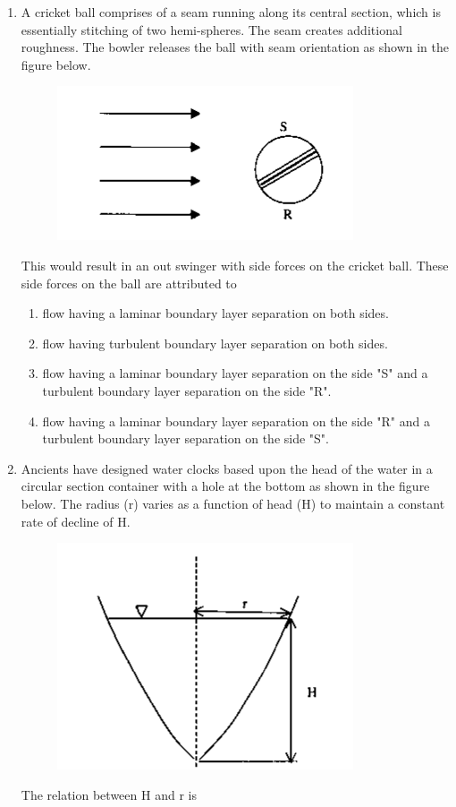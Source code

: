 \documentclass[a4paper,10pt]{article}
\begin{document}
\begin{enumerate}
\begin{multicols}{2}
\begin{enumerate}
\begin{figure}[H]
    \caption*{}
    \label{fig:opt4}
\end{figure}
\end{enumerate}
\end{multicols}

\item A cricket ball comprises of a seam running along its central section, which is essentially stitching of two hemi-spheres. The seam creates additional roughness. The bowler releases the ball with seam orientation as shown in the figure below.
\begin{figure}[H]
    \centering
    \includegraphics[width=0.3\columnwidth]{Bq11.png}
    \caption*{}
    \label{fig:q11}
\end{figure}
This would result in an out swinger with side forces on the cricket ball. These side forces on the ball are attributed to
\hfill{}

\begin{enumerate}
\item flow having a laminar boundary layer separation on both sides.
\item flow having turbulent boundary layer separation on both sides.
\item flow having a laminar boundary layer separation on the side "S" and a turbulent boundary layer separation on the side "R".
\item flow having a laminar boundary layer separation on the side "R" and a turbulent boundary layer separation on the side "S".
\end{enumerate}

\item Ancients have designed water clocks based upon the head of the water in a circular section container with a hole at the bottom as shown in the figure below. The radius (r) varies as a function of head (H) to maintain a constant rate of decline of H.
\begin{figure}[H]
    \centering
    \includegraphics[width=0.4\columnwidth]{Bq12.png}
    \caption*{}
    \label{fig:q12}
\end{figure}
The relation between H and r is
\hfill{}


\end{enumerate}
\end{document}
